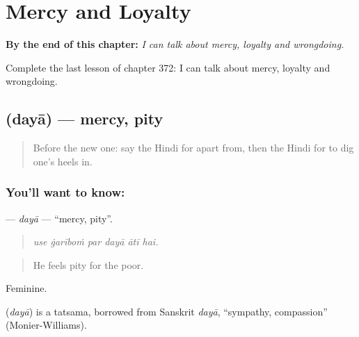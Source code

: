 
\chapter{Mercy and Loyalty}
\label{ch:hi-mercy-and-loyalty}

\begin{chapteropening}
\textbf{By the end of this chapter:} \emph{I can talk about mercy, loyalty and wrongdoing.}

Complete the last lesson of chapter 372: I can talk about mercy, loyalty and wrongdoing.
\end{chapteropening}

\section[\texorpdfstring{\hi{दया} (dayā)}{दया (dayā)}]{ (dayā) — mercy, pity}

\label{lesson:HI-C372-daya}



\begin{quote}
Before the new one: say the Hindi for apart from, then the Hindi for to dig one's heels in.
\end{quote}

\subsection*{You'll want to know: }
\textbf{} — \emph{dayā} — \textquotedblleft{}mercy, pity\textquotedblright{}.

\begin{quote}
     
\end{quote}

\begin{quote}
\emph{use ġarīboṁ par dayā ātī hai.}
\end{quote}

\begin{quote}
He feels pity for the poor.
\end{quote}

Feminine.

\begin{cousinweb}
\textbf{} (\emph{dayā}) is a tatsama, borrowed from Sanskrit \emph{dayā}, \textquotedblleft{}sympathy, compassion\textquotedblright{} (Monier-Williams).
\end{cousinweb}

